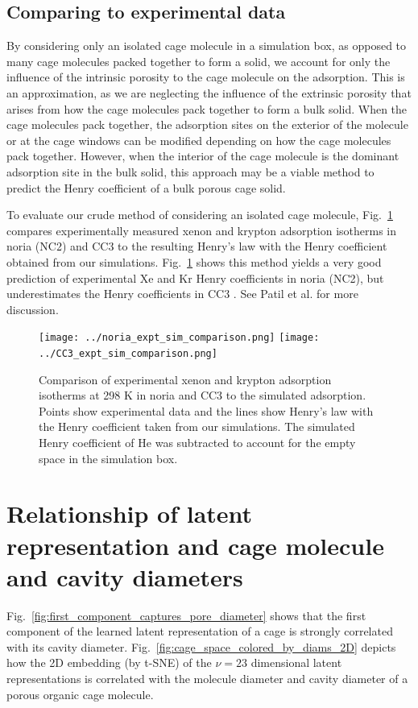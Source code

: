 \documentclass[journal=jacsat,manuscript=article]{achemso}
\begin{document}
\subsection{Comparing to experimental data}
By considering only an isolated cage molecule in a simulation box, as opposed to many cage molecules packed together to form a solid, we account for only the influence of the intrinsic porosity to the cage molecule on the adsorption. This is an approximation, as we are neglecting the influence of the extrinsic porosity that arises from how the cage molecules pack together to form a bulk solid. When the cage molecules pack together, the adsorption sites on the exterior of the molecule or at the cage windows can be modified depending on how the cage molecules pack together. However, when the interior of the cage molecule is the dominant adsorption site in the bulk solid, this approach may be a viable method to predict the Henry coefficient of a bulk porous cage solid.

To evaluate our crude method of considering an isolated cage molecule, Fig.~\ref{fig:expt_sim_compare} compares experimentally measured xenon and krypton adsorption isotherms in noria \cite{patil2016noria} (NC2) and CC3 \cite{chen2014separation} to the resulting Henry's law with the Henry coefficient obtained from our simulations. Fig.~\ref{fig:expt_sim_compare} shows this method yields a very good prediction of experimental Xe and Kr Henry coefficients in noria \cite{patil2016noria} (NC2), but underestimates the Henry coefficients in CC3 \cite{chen2014separation}. See Patil et al. \cite{patil2016noria} for more discussion.

\begin{figure}
\centering
	\texttt{[image: ../noria\_expt\_sim\_comparison.png]}
	\texttt{[image: ../CC3\_expt\_sim\_comparison.png]}
	\caption{Comparison of experimental xenon and krypton adsorption isotherms at 298 K in noria \cite{patil2016noria} and CC3 \cite{chen2014separation} to the simulated adsorption. Points show experimental data and the lines show Henry's law with the Henry coefficient taken from our simulations. The simulated Henry coefficient of He was subtracted to account for the empty space in the simulation box.
	} \label{fig:expt_sim_compare}
\end{figure}

\newpage
\clearpage

\section{Relationship of latent representation and cage molecule and cavity diameters}
Fig.~\ref{fig:first_component_captures_pore_diameter} shows that the first component of the learned latent representation of a cage is strongly correlated with its cavity diameter. 
Fig.~\ref{fig:cage_space_colored_by_diams_2D} depicts how the 2D embedding (by t-SNE) of the $\nu=23$ dimensional latent representations is correlated with the molecule diameter and cavity diameter of a porous organic cage molecule.
\end{document}

